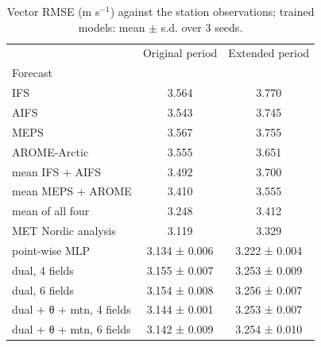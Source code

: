\begin{table}
\caption{Vector RMSE (m s$^{-1}$) against the station observations; trained models: mean $\pm$ s.d. over 3 seeds.}
\begin{tabular}{lcc}
\toprule
 & Original period & Extended period \\
Forecast &  &  \\
\midrule
IFS & 3.564 & 3.770 \\
AIFS & 3.543 & 3.745 \\
MEPS & 3.567 & 3.755 \\
AROME-Arctic & 3.555 & 3.651 \\
mean IFS + AIFS & 3.492 & 3.700 \\
mean MEPS + AROME & 3.410 & 3.555 \\
mean of all four & 3.248 & 3.412 \\
MET Nordic analysis & 3.119 & 3.329 \\
point-wise MLP & 3.134 ± 0.006 & 3.222 ± 0.004 \\
dual, 4 fields & 3.155 ± 0.007 & 3.253 ± 0.009 \\
dual, 6 fields & 3.154 ± 0.008 & 3.256 ± 0.007 \\
dual + θ + mtn, 4 fields & 3.144 ± 0.001 & 3.253 ± 0.007 \\
dual + θ + mtn, 6 fields & 3.142 ± 0.009 & 3.254 ± 0.010 \\
\bottomrule
\end{tabular}
\end{table}
